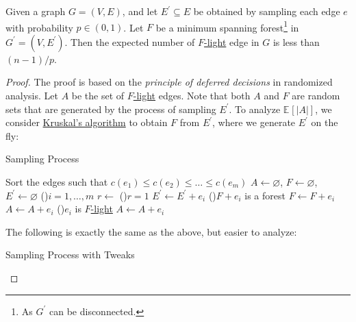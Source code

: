 \begin{lemma}\label{lma:sampling}
	Given a graph \(G=(V, E)\), and let \(E^{\prime} \subseteq E\) be obtained by sampling each edge \(e\) with probability \(p \in (0, 1)\). Let \(F\) be a minimum spanning forest\footnote{As \(G^{\prime} \) can be disconnected.} in \(G^{\prime} = (V, E^{\prime}) \). Then the expected number of \hyperref[def:light]{\(F\)-light} edge in \(G\) is less than \((n-1) / p\).
\end{lemma}
\begin{proof}
	The proof is based on the \emph{principle of deferred decisions} in randomized analysis. Let \(A\) be the set of \hyperref[def:light]{\(F\)-light} edges. Note that both \(A\) and \(F\) are random sets that are generated by the process of sampling \(E^{\prime} \). To analyze \(\mathbb{E}_{}[\lvert A \rvert ] \), we consider \hyperref[algo:Kruskal]{Kruskal's algorithm} to obtain \(F\) from \(E^{\prime} \), where we generate \(E^{\prime} \) on the fly:

	\begin{algorithm}[H]
		\DontPrintSemicolon{}
		\caption{Sampling Process}
		\BlankLine

		Sort the edges such that \(c(e_1) \leq c(e_2) \leq \dots \leq c(e_m)\)\;
		\(A \gets \varnothing \), \(F \gets \varnothing \), \(E^{\prime} \gets \varnothing \)\;
		\For(){\(i = 1, \dots , m\)}{
			\(r \gets\)
			\uIf(){\(r = 1\)}{
				\(E^{\prime} \gets E^{\prime} + e_i\)\;
				\If(){\(F + e_i\) is a forest}{
					\(F \gets F + e_i\)\;
					\(A \gets A + e_i\)\;
				}
			}
			\ElseIf(){\(e_i\) is \hyperref[def:light]{\(F\)-light}}{
				\(A \gets A + e_i\)\;
			}
		}
		\;
	\end{algorithm}

	The following is exactly the same as the above, but easier to analyze:

	\begin{algorithm}[H]
		\DontPrintSemicolon{}
		\caption{Sampling Process with Tweaks}
		\BlankLine


\end{algorithm}
\end{proof}
